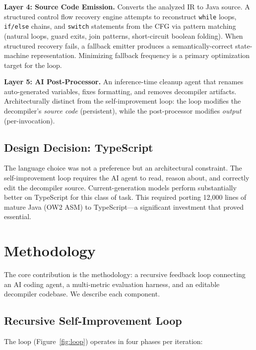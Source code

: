 \documentclass[conference,11pt]{IEEEtran}
\begin{document}
\textbf{Layer 4: Source Code Emission.} Converts the analyzed IR to Java source. A structured control flow recovery engine attempts to reconstruct \texttt{while} loops, \texttt{if/else} chains, and \texttt{switch} statements from the CFG via pattern matching (natural loops, guard exits, join patterns, short-circuit boolean folding). When structured recovery fails, a fallback emitter produces a semantically-correct state-machine representation. Minimizing fallback frequency is a primary optimization target for the loop.

\textbf{Layer 5: AI Post-Processor.} An inference-time cleanup agent that renames auto-generated variables, fixes formatting, and removes decompiler artifacts. Architecturally distinct from the self-improvement loop: the loop modifies the decompiler's \emph{source code} (persistent), while the post-processor modifies \emph{output} (per-invocation).

\subsection{Design Decision: TypeScript}

The language choice was not a preference but an architectural constraint. The self-improvement loop requires the AI agent to read, reason about, and correctly edit the decompiler source. Current-generation models perform substantially better on TypeScript for this class of task. This required porting 12,000 lines of mature Java (OW2 ASM) to TypeScript---a significant investment that proved essential.

\section{Methodology}
\label{sec:methodology}

The core contribution is the methodology: a recursive feedback loop connecting an AI coding agent, a multi-metric evaluation harness, and an editable decompiler codebase. We describe each component.

\subsection{Recursive Self-Improvement Loop}

The loop (Figure~\ref{fig:loop}) operates in four phases per iteration:
\end{document}
